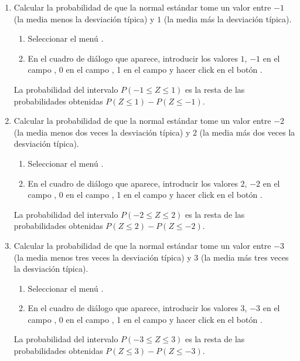 \begin{enumerate}[leftmargin=*]
\begin{enumerate}
\item Calcular la probabilidad de que la normal estándar tome un valor entre $-1$ (la media menos la desviación típica)
y $1$ (la media más la desviación típica).
\begin{indicacion}
\begin{enumerate}
\item Seleccionar el menú .
\item En el cuadro de diálogo que aparece, introducir los valores $1$, $-1$ en el campo ,
0 en el campo , 1 en el campo  y hacer click en el botón .
\end{enumerate}
La probabilidad del intervalo $P(-1\leq Z\leq 1)$ es la resta de las probabilidades obtenidas $P(Z\leq 1)-P(Z\leq -1)$.
\end{indicacion}

\item Calcular la probabilidad de que la normal estándar tome un valor entre $-2$ (la media menos dos veces la desviación típica) y $2$ (la
media más dos veces la desviación típica). 
\begin{indicacion}
\begin{enumerate}
\item Seleccionar el menú .
\item En el cuadro de diálogo que aparece, introducir los valores $2$, $-2$ en el campo ,
0 en el campo , 1 en el campo  y hacer click en el botón .
\end{enumerate}
La probabilidad del intervalo $P(-2\leq Z\leq 2)$ es la resta de las probabilidades obtenidas $P(Z\leq 2)-P(Z\leq -2)$.
\end{indicacion}

\item Calcular la probabilidad de que la normal estándar tome un valor entre $-3$ (la media menos tres veces la desviación típica) y $3$ (la
media más tres veces la desviación típica). 
\begin{indicacion}
\begin{enumerate}
\item Seleccionar el menú .
\item En el cuadro de diálogo que aparece, introducir los valores $3$, $-3$ en el campo ,
0 en el campo , 1 en el campo  y hacer click en el botón .
\end{enumerate}
La probabilidad del intervalo $P(-3\leq Z\leq 3)$ es la resta de las probabilidades obtenidas $P(Z\leq 3)-P(Z\leq -3)$.
\end{indicacion}


\end{enumerate}
\end{enumerate}
